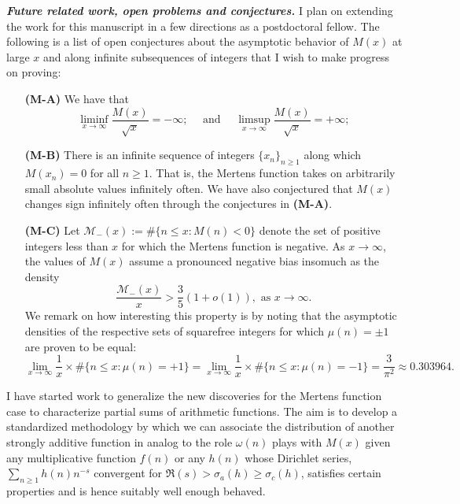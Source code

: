 \documentclass[10pt,reqno,letterpaper]{article}
\theoremstyle{plain}
\numberwithin{theorem}{section}
\theoremstyle{definition}
\begin{document}
\noindent 
{\small \textbf{\emph{Future related work, open problems and conjectures.}}} 
I plan on extending the work for this manuscript in a few directions 
as a postdoctoral fellow. 
The following is a list of open conjectures about the asymptotic behavior of $M(x)$ at 
large $x$ and along infinite subsequences of integers that I wish to make progress on proving: 
\begin{itemize}[leftmargin=0.475in,itemsep=-1.4mm,topsep=0pt]

\item[\textbf{(M-A)}] We have that 
     \[
     \liminf_{x \rightarrow \infty} \frac{M(x)}{\sqrt{x}} = -\infty; 
     \quad\text{ and }\quad 
     \limsup_{x \rightarrow \infty} \frac{M(x)}{\sqrt{x}} = +\infty;
     \]
\item[\textbf{(M-B)}] There is an infinite sequence of integers $\{x_n\}_{n \geq 1}$ 
                      along which $M(x_n) = 0$ for all $n \geq 1$. That is, the Mertens 
                      function takes on arbitrarily small absolute values infinitely often. 
                      We have also conjectured that $M(x)$ 
                      changes sign infinitely often through the conjectures in \textbf{(M-A)}. 
\item[\textbf{(M-C)}] Let $\mathcal{M}_{-}(x) := \#\{n \leq x: M(n) < 0\}$ denote 
                      the set of positive integers less than $x$ for which the Mertens function 
                      is negative. As $x \rightarrow \infty$, the values of $M(x)$ assume a 
                      pronounced negative bias insomuch as the density 
                      \[
                      \frac{\mathcal{M}_{-}(x)}{x} > \frac{3}{5}(1+o(1)), \text{ as } x \rightarrow \infty. 
                      \]
                      We remark on how interesting this property is by noting that the asymptotic 
                      densities of the respective sets of squarefree integers for which 
                      $\mu(n) = \pm 1$ are proven to be equal: 
                      \[
                      \lim_{x \rightarrow \infty} \frac{1}{x} \times \#\{n \leq x: \mu(n) = +1\} = 
                      \lim_{x \rightarrow \infty} \frac{1}{x} \times \#\{n \leq x: \mu(n) = -1\} = 
                      \frac{3}{\pi^2} \approx 0.303964. 
                 \]

\end{itemize}
I have started work to generalize the new discoveries for the Mertens function case to 
characterize partial sums of arithmetic functions. 
The aim is to develop a standardized methodology by which we can associate the distribution of another  
strongly additive function in analog to the role $\omega(n)$ plays with $M(x)$ given any 
multiplicative function $f(n)$ or any $h(n)$ whose Dirichlet series, 
$\sum_{n \geq 1} h(n) n^{-s}$ convergent for 
$\Re(s) > \sigma_{a}(h) \geq \sigma_{c}(h)$, satisfies 
certain properties and is hence suitably well enough behaved. 
\end{document}
